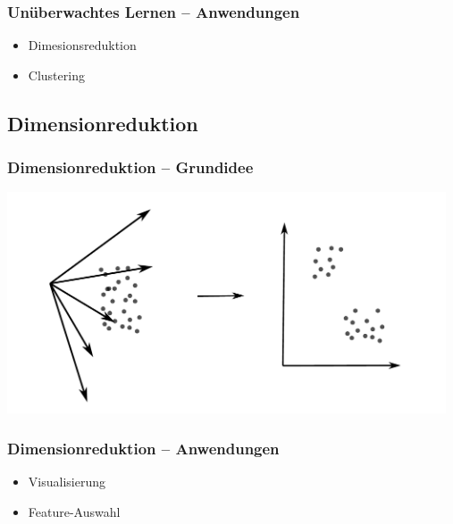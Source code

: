 \documentclass[aspectratio=169]{beamer}
\begin{document}
\setcounter{tocdepth}{2}
\begin{frame}{}
   \tableofcontents[currentsubsection,hideothersubsections,
     subsectionstyle=show/shaded]
\end{frame}

\begin{frame}
  \frametitle{Unüberwachtes Lernen -- Anwendungen}
  \begin{block}{}
    \begin{itemize}
    \item Dimesionsreduktion
    \item Clustering
    \end{itemize}
  \end{block}
\end{frame}

\subsection{Dimensionreduktion}

\setcounter{tocdepth}{2}
\begin{frame}{}
   \tableofcontents[currentsubsection,hideothersubsections,
     subsectionstyle=show/shaded]
\end{frame}

\begin{frame}
  \frametitle{Dimensionreduktion -- Grundidee}
  \begin{center}
    \includegraphics[width=13.0cm]{images/dimension_reduction.pdf}
  \end{center}
\end{frame}

\begin{frame}
  \frametitle{Dimensionreduktion -- Anwendungen}
  \begin{block}{}
    \begin{center}
      \begin{itemize}
      \item Visualisierung
      \item Feature-Auswahl
      \end{itemize}
    \end{center}
  \end{block}
\end{frame}
\end{document}
